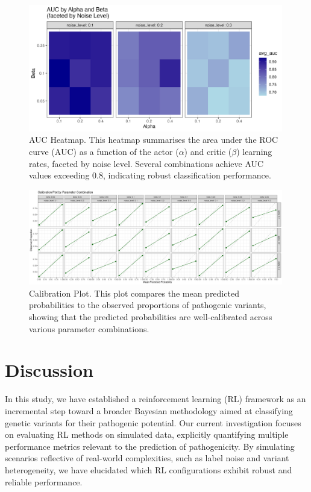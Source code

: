 \begin{figure}[h]
    \centering
    \includegraphics[width=0.99\textwidth]{../figures/auc.png}
    \caption{AUC Heatmap. This heatmap summarises the area under the ROC curve (AUC) as a function of the actor ($\alpha$) and critic ($\beta$) learning rates, faceted by noise level. Several combinations achieve AUC values exceeding 0.8, indicating robust classification performance.}
    \label{fig:auc}
\end{figure}

\begin{figure}[h]
    \centering
    \includegraphics[width=0.99\textwidth]{../figures/calibration.png}
    \caption{Calibration Plot. This plot compares the mean predicted probabilities to the observed proportions of pathogenic variants, showing that the predicted probabilities are well-calibrated across various parameter combinations.}
    \label{fig:calibration}
\end{figure}


\clearpage

\section{Discussion}
In this study, we have established a reinforcement learning (RL) framework as an incremental step toward a broader Bayesian methodology aimed at classifying genetic variants for their pathogenic potential. Our current investigation focuses on evaluating RL methods on simulated data, explicitly quantifying multiple performance metrics relevant to the prediction of pathogenicity. By simulating scenarios reflective of real-world complexities, such as label noise and variant heterogeneity, we have elucidated which RL configurations exhibit robust and reliable performance.

